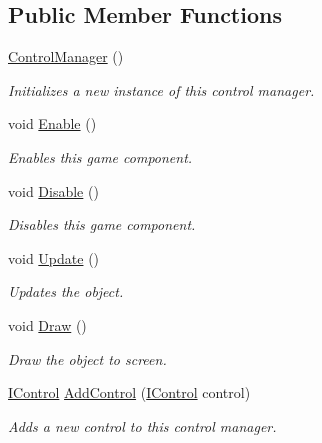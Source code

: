 \subsection*{Public Member Functions}
\begin{DoxyCompactItemize}
\item 
\hyperlink{class_tri_devs_1_1_tri_engine2_d_1_1_u_i_1_1_control_manager_a821a1a80c87c3c3569c29b549149ab98}{Control\-Manager} ()
\begin{DoxyCompactList}\small\item\em Initializes a new instance of this control manager. \end{DoxyCompactList}\item 
void \hyperlink{class_tri_devs_1_1_tri_engine2_d_1_1_u_i_1_1_control_manager_ab5bf7aa70976355946de7edde44921f3}{Enable} ()
\begin{DoxyCompactList}\small\item\em Enables this game component. \end{DoxyCompactList}\item 
void \hyperlink{class_tri_devs_1_1_tri_engine2_d_1_1_u_i_1_1_control_manager_a7badfa605331ff9d6a28f22d2eebf419}{Disable} ()
\begin{DoxyCompactList}\small\item\em Disables this game component. \end{DoxyCompactList}\item 
void \hyperlink{class_tri_devs_1_1_tri_engine2_d_1_1_u_i_1_1_control_manager_a9961980ad217dbeafc3890f7f45f2e08}{Update} ()
\begin{DoxyCompactList}\small\item\em Updates the object. \end{DoxyCompactList}\item 
void \hyperlink{class_tri_devs_1_1_tri_engine2_d_1_1_u_i_1_1_control_manager_a983b69c93c3d66ef1d7f324d3ea80ace}{Draw} ()
\begin{DoxyCompactList}\small\item\em Draw the object to screen. \end{DoxyCompactList}\item 
\hyperlink{interface_tri_devs_1_1_tri_engine2_d_1_1_u_i_1_1_i_control}{I\-Control} \hyperlink{class_tri_devs_1_1_tri_engine2_d_1_1_u_i_1_1_control_manager_a8279a97e05851a687461e8cd769b9c02}{Add\-Control} (\hyperlink{interface_tri_devs_1_1_tri_engine2_d_1_1_u_i_1_1_i_control}{I\-Control} control)
\begin{DoxyCompactList}\small\item\em Adds a new control to this control manager. \end{DoxyCompactList}\item 

\end{DoxyCompactItemize}
